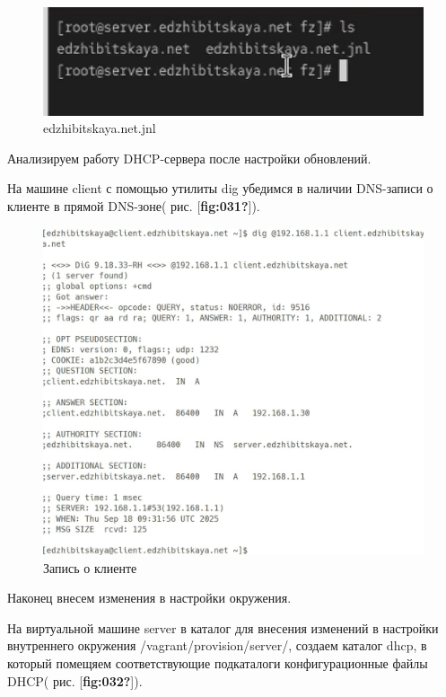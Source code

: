 \documentclass[
  english,
  russian,
  12pt,
  a4paper,
  DIV=11,
  numbers=noendperiod]{scrreprt}
\begin{document}
\begin{figure}

{\centering \includegraphics[width=0.7\linewidth,height=\textheight,keepaspectratio]{image/30.jpg}

}

\caption{edzhibitskaya.net.jnl}

\end{figure}%

Анализируем работу DHCP-сервера после настройки обновлений.

На машине client с помощью утилиты dig убедимся в наличии DNS-записи о
клиенте в прямой DNS-зоне( рис. {[}\textbf{fig:031?}{]}).

\begin{figure}

{\centering \includegraphics[width=0.7\linewidth,height=\textheight,keepaspectratio]{image/37.jpg}

}

\caption{Запись о клиенте}

\end{figure}%

Наконец внесем изменения в настройки окружения.

На виртуальной машине server в каталог для внесения изменений в
настройки внутреннего окружения /vagrant/provision/server/, создаем
каталог dhcp, в который помещяем соответствующие подкаталоги
конфигурационные файлы DHCP( рис. {[}\textbf{fig:032?}{]}).
\end{document}

